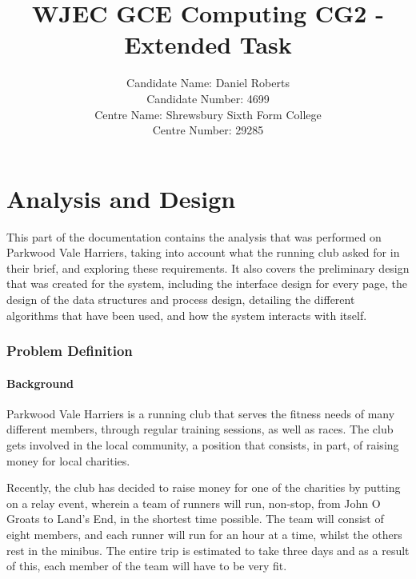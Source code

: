 \documentclass{article}[12pt,a4paper]
\begin{document}
\title{WJEC GCE Computing CG2 - Extended Task}

\author{Candidate Name: Daniel Roberts\\
        Candidate Number: 4699\\
        Centre Name: Shrewsbury Sixth Form College\\
        Centre Number: 29285}

\date{}

\maketitle

\tableofcontents

\cleardoublepage

\part{Analysis and Design}
This part of the documentation contains the analysis that was performed on Parkwood Vale Harriers, taking into account what the running club asked for in their brief, and exploring these requirements. It also covers the preliminary design that was created for the system, including the interface design for every page, the design of the data structures and process design, detailing the different algorithms that have been used, and how the system interacts with itself.

\section{Problem Definition}
\subsection{Background}
Parkwood Vale Harriers is a running club that serves the fitness needs of many different members, through regular training sessions, as well as races. The club gets involved in the local community, a position that consists, in part, of raising money for local charities. 

Recently, the club has decided to raise money for one of the charities by putting on a relay event, wherein a team of runners will run, non-stop, from John O\textsc{} Groats to Land’s End, in the shortest time possible. The team will consist of eight members, and each runner will run for an hour at a time, whilst the others rest in the minibus. The entire trip is estimated to take three days and as a result of this, each member of the team will have to be very fit.
\end{document}
